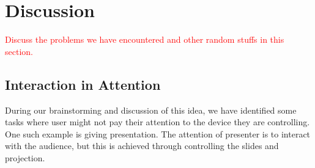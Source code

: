 
\section{Discussion}
\label{sec:discussion}

\textcolor{red}{Discuss the problems we have encountered and other random stuffs in this section.}

\subsection{Interaction in Attention}
\label{sec:inter-attent}

During our brainstorming and discussion of this idea, we have identified some tasks where user might not pay their attention to the device they are controlling. One such example is giving presentation. The attention of presenter is to interact with the audience, but this is achieved through controlling the slides and projection.

